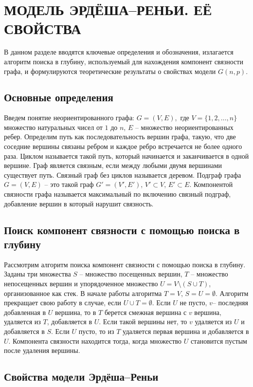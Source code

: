 \section{МОДЕЛЬ ЭРДЁША--РЕНЬИ. ЕЁ СВОЙСТВА}
\label{g1}
В данном разделе вводятся ключевые определения и обозначения, 
излагается алгоритм поиска в глубину, используемый для нахождения 
компонент связности графа, и формулируются теоретические результаты
о свойствах модели $G(n,p)$.
\subsection{Основные определения}

Введем понятие неориентированного графа: $G=(V,E)$, где  $V = \{1, 2, \dots, n\}$ множество натуральных чисел от 
$1$ до  $n$, $E$ -- множество неориентированных ребер. Определим
путь как последовательность вершин графа, такую, что
две соседние вершины связаны ребром и каждое ребро встречается не более одного раза. Циклом называется такой путь, 
который начинается и заканчивается в одной вершине. Граф является связным, если между любыми двумя вершинами существует 
путь. Связный граф без циклов называется деревом. Подграф графа $G = (V,E)$ -- это такой граф $G' =(V',E')$,
$V' \subset V$, $E' \subset E$. Компонентой связности графа 
называется максимальный по включению связный подграф, добавление вершин в который 
нарушит связность.
\subsection{Поиск компонент связности с помощью поиска в глубину}
Рассмотрим алгоритм поиска компонент связности с помощью поиска в 
глубину. Заданы три множества $S$ -- множество посещенных вершин,
 $T$ -- множество непосещенных вершин и упорядоченное множество $U = V \setminus (S \cup T)$, организованное как стек. В начале работы алгоритма $T=V$,
 $S= U = \emptyset$. Алгоритм прекращает свою работу в случае, если
 $U \cup T = \emptyset$. Если $U$ не пусто, $v$-- последняя добавленная в  $U$ вершина, то в  $T$ 
 берется смежная вершина с $v$ вершина, удаляется из  $T$,   
 добавляется в  $U$. Если такой вершины нет, то  $v$ удаляется 
 из  $U$ и добавляется в  $S$. Если  $U$ пусто, то из 
 $T$ удаляется первая вершина и добавляется в  $U$. 
 Компонента связности находится тогда, когда множество  $U$
 становится пустым после удаления вершины.
\subsection{Свойства модели Эрдёша--Реньи}

